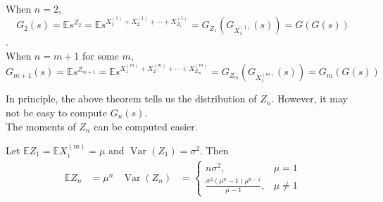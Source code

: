 \documentclass{huhtakm-template-book}
\newcommand{\expect}{\mathbb{E}}
\DeclareMathOperator{\Var}{Var}
\begin{document}
    \begin{proofing}
        When $n=2$, 
        \begin{equation*}
            G_{2}(s)=\expect s^{Z_{2}}=\expect s^{X_{1}^{(1)}+X_{2}^{(1)}+\cdots+X_{Z_{1}}^{(1)}}=G_{Z_{1}}\left(G_{X_{1}^{(1)}}(s)\right)=G(G(s))
        \end{equation*}.\\
        When $n=m+1$ for some $m$,
        \begin{equation*}
            G_{m+1}(s)=\expect s^{Z_{m+1}}=\expect s^{X_{1}^{(m)}+X_{2}^{(m)}+\cdots+X_{Z_{m}}^{(m)}}=G_{Z_{m}}\left(G_{X_{1}^{(m)}}(s)\right)=G_{m}(G(s))
        \end{equation*}
    \end{proofing}
    In principle, the above theorem tells us the distribution of $Z_{n}$. However, it may not be easy to compute $G_{n}(s)$.\\
    The moments of $Z_{n}$ can be computed easier.
    \begin{lem}
        Let $\expect Z_{1}=\expect X_{i}^{(m)}=\mu$ and $\Var(Z_{1})=\sigma^{2}$. Then
        \begin{align*}
            \expect Z_{n}&=\mu^{n} & \Var(Z_{n})&=\begin{cases}
                n\sigma^{2}, &\mu=1\\
                \frac{\sigma^{2}(\mu^{n}-1)\mu^{n-1}}{\mu-1}, &\mu\neq 1
            \end{cases}
        \end{align*}
    \end{lem}
    \newpage
\end{document}
